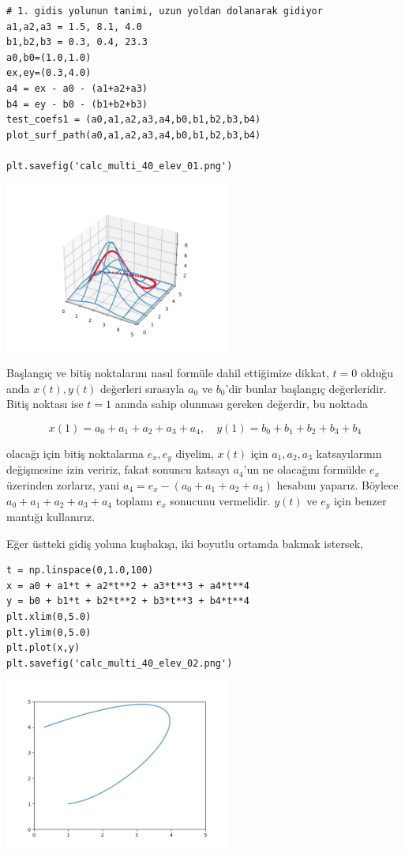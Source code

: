 \documentclass[12pt,fleqn]{article}\usepackage{../../common}
\begin{document}
\begin{verbatim}
# 1. gidis yolunun tanimi, uzun yoldan dolanarak gidiyor
a1,a2,a3 = 1.5, 8.1, 4.0
b1,b2,b3 = 0.3, 0.4, 23.3
a0,b0=(1.0,1.0)
ex,ey=(0.3,4.0)
a4 = ex - a0 - (a1+a2+a3)
b4 = ey - b0 - (b1+b2+b3)
test_coefs1 = (a0,a1,a2,a3,a4,b0,b1,b2,b3,b4)
plot_surf_path(a0,a1,a2,a3,a4,b0,b1,b2,b3,b4)

plt.savefig('calc_multi_40_elev_01.png')
\end{verbatim}


\includegraphics[width=20em]{calc_multi_40_elev_01.png}

Başlangıç ve bitiş noktalarını nasıl formüle dahil ettiğimize dikkat, $t=0$
olduğu anda $x(t),y(t)$ değerleri sırasıyla $a_0$ ve $b_0$'dir bunlar başlangıç
değerleridir. Bitiş noktası ise $t=1$ anında sahip olunması gereken değerdir,
bu noktada

$$
x(1) = a_0 + a_1 + a_2 + a_3 + a_4 ,\quad
y(1) = b_0 + b_1 + b_2 + b_3 + b_4 
$$

olacağı için bitiş noktalarına $e_x,e_y$ diyelim, $x(t)$ için $a_1,a_2,a_3$
katsayılarının değişmesine izin veririz, fakat sonuncu katsayı $a_4$'un ne
olacağını formülde $e_x$ üzerinden zorlarız, yani $a_4 = e_x - (a_0 + a_1 + a_2
+ a_3)$ hesabını yaparız. Böylece $a_0 + a_1 + a_2 + a_3 + a_4$ toplamı
$e_x$ sonucunu vermelidir. $y(t)$ ve $e_y$ için benzer mantığı kullanırız.

Eğer üstteki gidiş yoluna kuşbakışı, iki boyutlu ortamda bakmak istersek,

\begin{verbatim}
t = np.linspace(0,1.0,100)
x = a0 + a1*t + a2*t**2 + a3*t**3 + a4*t**4 
y = b0 + b1*t + b2*t**2 + b3*t**3 + b4*t**4
plt.xlim(0,5.0)
plt.ylim(0,5.0)
plt.plot(x,y)
plt.savefig('calc_multi_40_elev_02.png')
\end{verbatim}

\includegraphics[width=20em]{calc_multi_40_elev_02.png}
\end{document}
